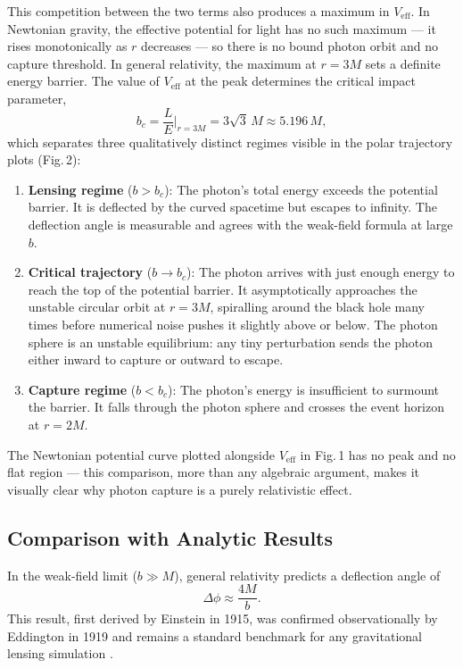 \documentclass[12pt,a4paper]{article}
\begin{document}
This competition between the two terms also produces a maximum in $V_\mathrm{eff}$.
In Newtonian gravity, the effective potential for light has no such maximum —
it rises monotonically as $r$ decreases — so there is no bound photon orbit and
no capture threshold. In general relativity, the maximum at $r = 3M$ sets a
definite energy barrier. The value of $V_\mathrm{eff}$ at the peak determines the
critical impact parameter,
\begin{equation}
    b_c = \frac{L}{E}\bigg|_{r=3M} = 3\sqrt{3}\,M \approx 5.196\,M,
\end{equation}
which separates three qualitatively distinct regimes visible in the polar
trajectory plots (Fig.\,2):

\begin{enumerate}
    \item \textbf{Lensing regime} ($b > b_c$): The photon's total energy exceeds
    the potential barrier. It is deflected by the curved spacetime but escapes to
    infinity. The deflection angle is measurable and agrees with the weak-field
    formula at large $b$.

    \item \textbf{Critical trajectory} ($b \to b_c$): The photon arrives with just
    enough energy to reach the top of the potential barrier. It asymptotically
    approaches the unstable circular orbit at $r = 3M$, spiralling around the
    black hole many times before numerical noise pushes it slightly above or
    below. The photon sphere is an unstable equilibrium: any tiny perturbation
    sends the photon either inward to capture or outward to escape.

    \item \textbf{Capture regime} ($b < b_c$): The photon's energy is insufficient
    to surmount the barrier. It falls through the photon sphere and crosses the
    event horizon at $r = 2M$.
\end{enumerate}

The Newtonian potential curve plotted alongside $V_\mathrm{eff}$ in Fig.\,1 has no
peak and no flat region — this comparison, more than any algebraic argument,
makes it visually clear why photon capture is a purely relativistic effect.

\subsection{Comparison with Analytic Results}

In the weak-field limit ($b \gg M$), general relativity predicts a deflection
angle of
\begin{equation}
    \Delta\phi \approx \frac{4M}{b}.
\end{equation}
This result, first derived by Einstein in 1915, was confirmed observationally
by Eddington in 1919 and remains a standard benchmark for any gravitational
lensing simulation \citep{Hobson2006, Schutz2022}.
\end{document}
